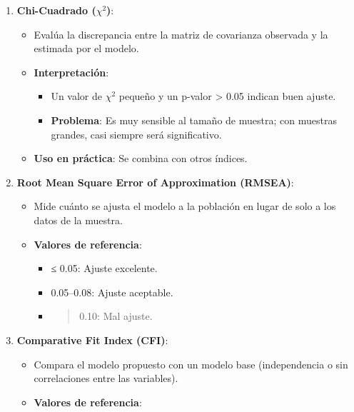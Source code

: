 \documentclass[
]{article}
\providecommand{\tightlist}{%
  \setlength{\itemsep}{0pt}\setlength{\parskip}{0pt}}
\begin{document}
\begin{enumerate}
\def\labelenumi{\arabic{enumi}.}
\tightlist
\item
  \textbf{Chi-Cuadrado (\(\chi^2\))}:

  \begin{itemize}
  \tightlist
  \item
    Evalúa la discrepancia entre la matriz de covarianza observada y la
    estimada por el modelo.
  \item
    \textbf{Interpretación}:

    \begin{itemize}
    \tightlist
    \item
      Un valor de \(\chi^2\) pequeño y un p-valor \textgreater{} 0.05
      indican buen ajuste.
    \item
      \textbf{Problema}: Es muy sensible al tamaño de muestra; con
      muestras grandes, casi siempre será significativo.
    \end{itemize}
  \item
    \textbf{Uso en práctica}: Se combina con otros índices.
  \end{itemize}
\item
  \textbf{Root Mean Square Error of Approximation (RMSEA)}:

  \begin{itemize}
  \tightlist
  \item
    Mide cuánto se ajusta el modelo a la población en lugar de solo a
    los datos de la muestra.
  \item
    \textbf{Valores de referencia}:

    \begin{itemize}
    \item
      ≤ 0.05: Ajuste excelente.
    \item
      0.05--0.08: Ajuste aceptable.
    \item
      \begin{quote}
      0.10: Mal ajuste.
      \end{quote}
    \end{itemize}
  \end{itemize}
\item
  \textbf{Comparative Fit Index (CFI)}:

  \begin{itemize}
  \tightlist
  \item
    Compara el modelo propuesto con un modelo base (independencia o sin
    correlaciones entre las variables).
  \item
    \textbf{Valores de referencia}:


\end{itemize}
\end{enumerate}
\end{document}
